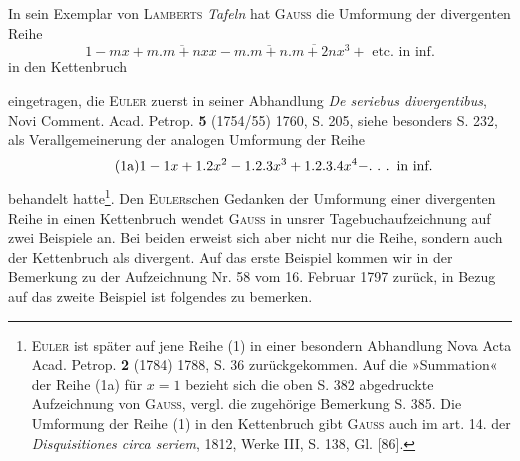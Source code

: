 \medskip\begingroup\small\makeatletter\let\veqno\@@leqno\makeatother
\indent In sein Exemplar von \textsc{Lamberts} \textit{Tafeln} hat \textsc{Gauss} die Umformung der divergenten Reihe
\begin{equation*}\tag*{(1)}
1-mx+m.\overline{m+n}xx-m.\overline{m+n}.\overline{m+2n}x^3+\text{ etc. in inf.}
\end{equation*}
\noindent in den Kettenbruch
\begin{center}
\end{center}
\noindent eingetragen, die \textsc{Euler} zuerst in seiner Abhandlung \textit{De seriebus divergentibus}, Novi Comment. Acad. Petrop. \textbf{5} (1754/55) 1760, S. 205, siehe besonders S. 232, als Verallgemeinerung der analogen Umformung der Reihe
\begin{equation*}\tag*{(1a)}
1-1x+1.2x^2-1.2.3x^3+1.2.3.4x^4-\ldotp\,\ldotp\,\ldotp\text{ in inf.}
\end{equation*}
\noindent behandelt hatte\footnote{\textsc{Euler} ist später auf jene Reihe (1) in einer besondern Abhandlung Nova Acta Acad. Petrop. \textbf{2} (1784) 1788, S. 36 zurückgekommen. Auf die »Summation« der Reihe (1a) für \(x=1\) bezieht sich die oben S. 382 abgedruckte Aufzeichnung von \textsc{Gauss}, vergl. die zugehörige Bemerkung S. 385. Die Umformung der Reihe (1) in den Kettenbruch gibt \textsc{Gauss} auch im art. 14. der \textit{Disquisitiones circa seriem}, 1812, Werke III, S. 138, Gl. [86].}. Den \textsc{Euler}schen Gedanken der Umformung einer divergenten Reihe in einen Kettenbruch wendet \textsc{Gauss} in unsrer Tagebuchaufzeichnung auf zwei Beispiele an. Bei beiden erweist sich aber nicht nur die Reihe, sondern auch der Kettenbruch als divergent. Auf das erste Beispiel kommen wir in der Bemerkung zu der Aufzeichnung Nr. 58 vom 16. Februar 1797 zurück, in Bezug auf das zweite Beispiel ist folgendes zu bemerken.

